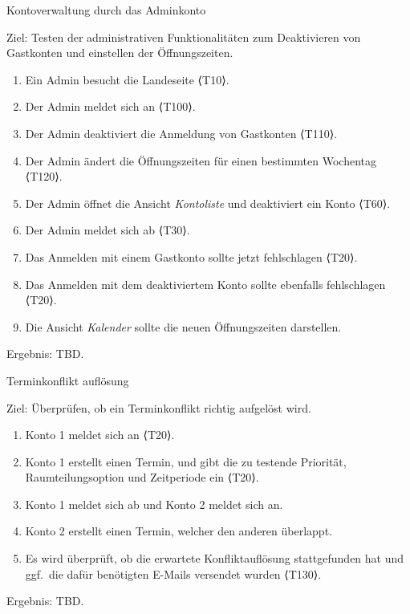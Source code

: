 \pagebreak

\begin{scenario}{40}{Kontoverwaltung durch das Adminkonto}
    \item[Ziel:] Testen der administrativen Funktionalitäten zum Deaktivieren von Gastkonten und einstellen der Öffnungszeiten.
    \begin{enumerate}
        \item Ein Admin besucht die Landeseite ⟨T10⟩.
        \item Der Admin meldet sich an ⟨T100⟩.
        \item Der Admin deaktiviert die Anmeldung von Gastkonten ⟨T110⟩.
        \item Der Admin ändert die Öffnungszeiten für einen bestimmten Wochentag ⟨T120⟩.
        \item Der Admin öffnet die Ansicht \textit{Kontoliste} und deaktiviert ein Konto ⟨T60⟩.
        \item Der Admin meldet sich ab ⟨T30⟩.
        \item Das Anmelden mit einem Gastkonto sollte jetzt fehlschlagen ⟨T20⟩.
        \item Das Anmelden mit dem deaktiviertem Konto sollte ebenfalls fehlschlagen ⟨T20⟩.
        \item Die Ansicht \textit{Kalender} sollte die neuen Öffnungszeiten darstellen.
    \end{enumerate}
    \item[Ergebnis:] TBD.
\end{scenario}

\begin{scenario}{50}{Terminkonflikt auflösung}
    \item[Ziel:] Überprüfen, ob ein Terminkonflikt richtig aufgelöst wird.
    \begin{enumerate}
        \item Konto 1 meldet sich an ⟨T20⟩.
        \item Konto 1 erstellt einen Termin, und gibt die zu testende Priorität, Raumteilungsoption und Zeitperiode ein ⟨T20⟩.
        \item Konto 1 meldet sich ab und Konto 2 meldet sich an.
        \item Konto 2 erstellt einen Termin, welcher den anderen überlappt.
        \item Es wird überprüft, ob die erwartete Konfliktauflösung stattgefunden hat und ggf.\ die dafür benötigten E-Mails versendet wurden ⟨T130⟩.
    \end{enumerate}
    \item[Ergebnis:] TBD.
\end{scenario}
